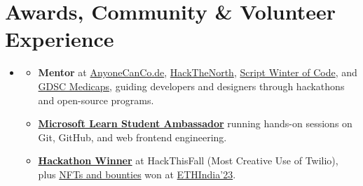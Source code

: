 \documentclass[letterpaper,10pt]{article}
\newcommand{\roleGap}{7pt}
\newcommand{\entryListStart}{\begin{itemize}[leftmargin=0.15in, label={}, itemsep=\roleGap, topsep=0pt, parsep=0pt, partopsep=0pt]}
\newcommand{\entryListEnd}{\end{itemize}}
\newcommand{\bulletListStart}{\begin{itemize}[itemsep=2pt, topsep=2pt, parsep=0pt, partopsep=0pt]}
\newcommand{\bulletListEnd}{\end{itemize}}
\newcommand{\resumeItem}[1]{\item #1}
\begin{document}
\section{Awards, Community \& Volunteer Experience}
\entryListStart
\item
\bulletListStart
  \resumeItem{\textbf{Mentor} at \href{https://hackacode.anyonecanco.de}{AnyoneCanCo.de}, \href{https://hackthenorth.com}{HackTheNorth}, \href{https://swoc.scriptindia.org}{Script Winter of Code}, and \href{https://gdsc.community.dev/medi-caps-university-indore}{GDSC Medicaps}, guiding developers and designers through hackathons and open-source programs.}
  \resumeItem{\textbf{\href{https://studentambassadors.microsoft.com/}{Microsoft Learn Student Ambassador}} running hands-on sessions on Git, GitHub, and web frontend engineering.}
  \resumeItem{\textbf{\href{https://devpost.com/software/budgetstay}{Hackathon Winner}} at HackThisFall (Most Creative Use of Twilio), plus \href{https://devfolio.co/projects/mystic-899b}{NFTs and bounties} won at \href{https://ethindia.co/}{ETHIndia'23}.}
\bulletListEnd
\entryListEnd
\end{document}

